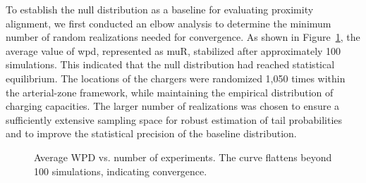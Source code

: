 To establish the null distribution as a baseline for evaluating proximity alignment, we first conducted an elbow analysis to determine the minimum number of random realizations needed for convergence. As shown in Figure~\ref{fig:elbow_plot}, the average value of \gls{wpd}, represented as \gls{muR}, stabilized after approximately 100 simulations. This indicated that the null distribution had reached statistical equilibrium. 
The locations of the chargers were randomized 1,050 times within the arterial-zone framework, while maintaining the empirical distribution of charging capacities. The larger number of realizations was chosen to ensure a sufficiently extensive sampling space for robust estimation of tail probabilities and to improve the statistical precision of the baseline distribution.
\begin{figure}[htbp]
  \centering
  \caption{Average WPD vs. number of experiments. The curve flattens beyond 100 simulations, indicating convergence.}
  \label{fig:elbow_plot}
\end{figure}
